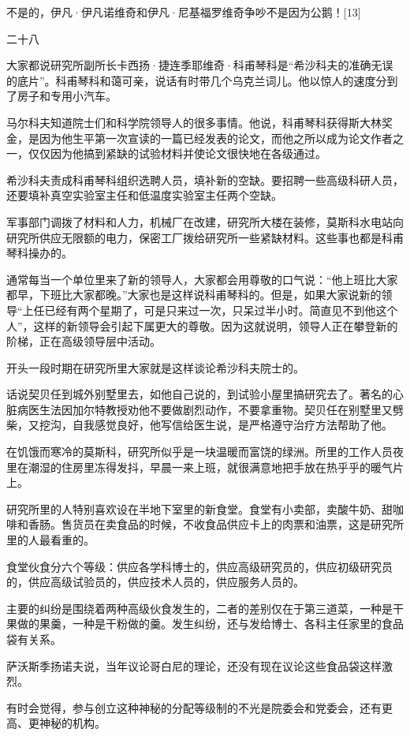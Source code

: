 不是的，伊凡·伊凡诺维奇和伊凡·尼基福罗维奇争吵不是因为公鹅！[13]

二十八

大家都说研究所副所长卡西扬·捷连季耶维奇·科甫琴科是“希沙科夫的准确无误的底片”。科甫琴科和蔼可亲，说话有时带几个乌克兰词儿。他以惊人的速度分到了房子和专用小汽车。

马尔科夫知道院士们和科学院领导人的很多事情。他说，科甫琴科获得斯大林奖金，是因为他生平第一次宣读的一篇已经发表的论文，而他之所以成为论文作者之一，仅仅因为他搞到紧缺的试验材料并使论文很快地在各级通过。

希沙科夫责成科甫琴科组织选聘人员，填补新的空缺。要招聘一些高级科研人员，还要填补真空实验室主任和低温度实验室主任两个空缺。

军事部门调拨了材料和人力，机械厂在改建，研究所大楼在装修，莫斯科水电站向研究所供应无限额的电力，保密工厂拨给研究所一些紧缺材料。这些事也都是科甫琴科操办的。

通常每当一个单位里来了新的领导人，大家都会用尊敬的口气说：“他上班比大家都早，下班比大家都晚。”大家也是这样说科甫琴科的。但是，如果大家说新的领导“上任已经有两个星期了，可是只来过一次，只呆过半小时。简直见不到他这个人”，这样的新领导会引起下属更大的尊敬。因为这就说明，领导人正在攀登新的阶梯，正在高级领导层中活动。

开头一段时期在研究所里大家就是这样谈论希沙科夫院士的。

话说契贝任到城外别墅里去，如他自己说的，到试验小屋里搞研究去了。著名的心脏病医生法因加尔特教授劝他不要做剧烈动作，不要拿重物。契贝任在别墅里又劈柴，又挖沟，自我感觉良好，他写信给医生说，是严格遵守治疗方法帮助了他。

在饥饿而寒冷的莫斯科，研究所似乎是一块温暖而富饶的绿洲。所里的工作人员夜里在潮湿的住房里冻得发抖，早晨一来上班，就很满意地把手放在热乎乎的暖气片上。

研究所里的人特别喜欢设在半地下室里的新食堂。食堂有小卖部，卖酸牛奶、甜咖啡和香肠。售货员在卖食品的时候，不收食品供应卡上的肉票和油票，这是研究所里的人最看重的。

食堂伙食分六个等级：供应各学科博士的，供应高级研究员的，供应初级研究员的，供应高级试验员的，供应技术人员的，供应服务人员的。

主要的纠纷是围绕着两种高级伙食发生的，二者的差别仅在于第三道菜，一种是干果做的果羹，一种是干粉做的羹。发生纠纷，还与发给博士、各科主任家里的食品袋有关系。

萨沃斯季扬诺夫说，当年议论哥白尼的理论，还没有现在议论这些食品袋这样激烈。

有时会觉得，参与创立这种神秘的分配等级制的不光是院委会和党委会，还有更高、更神秘的机构。

